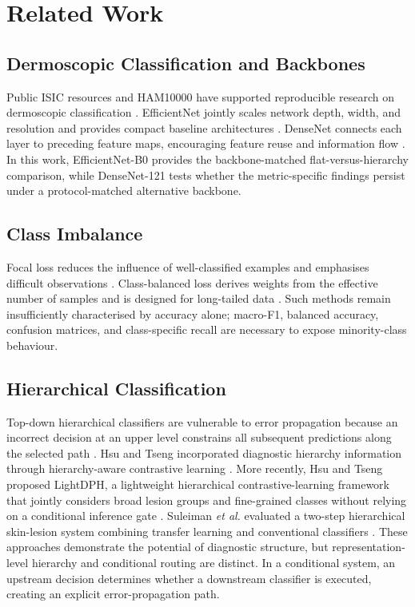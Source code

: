 \section{Related Work}
\label{sec:related_work}

\subsection{Dermoscopic Classification and Backbones}

Public ISIC resources and HAM10000 have supported reproducible research on
dermoscopic classification
\cite{codella2019isic2018,tschandl2018ham10000}. EfficientNet jointly scales
network depth, width, and resolution and provides compact baseline
architectures \cite{tan2019efficientnet}. DenseNet connects each layer to
preceding feature maps, encouraging feature reuse and information flow
\cite{huang2017}. In this work, EfficientNet-B0 provides the backbone-matched
flat-versus-hierarchy comparison, while DenseNet-121 tests whether the
metric-specific findings persist under a protocol-matched alternative
backbone.

\subsection{Class Imbalance}

Focal loss reduces the influence of well-classified examples and emphasises
difficult observations \cite{lin2017focal}. Class-balanced loss derives
weights from the effective number of samples and is designed for long-tailed
data \cite{cui2019classbalanced}. Such methods remain insufficiently
characterised by accuracy alone; macro-F1, balanced accuracy, confusion
matrices, and class-specific recall are necessary to expose minority-class
behaviour.

\subsection{Hierarchical Classification}

Top-down hierarchical classifiers are vulnerable to error propagation because
an incorrect decision at an upper level constrains all subsequent predictions
along the selected path \cite{silla2011survey}.
Hsu and Tseng incorporated diagnostic hierarchy information through
hierarchy-aware contrastive learning \cite{hsu2022hierarchy}. More recently, Hsu and Tseng proposed LightDPH, a lightweight
hierarchical contrastive-learning framework that jointly considers broad
lesion groups and fine-grained classes without relying on a conditional
inference gate \cite{hsu2024lightdph}. Suleiman
\emph{et al.} evaluated a two-step hierarchical skin-lesion system combining
transfer learning and conventional classifiers
\cite{suleiman2024twostep}. These approaches demonstrate the potential of
diagnostic structure, but representation-level hierarchy and conditional
routing are distinct. In a conditional system, an upstream decision determines
whether a downstream classifier is executed, creating an explicit
error-propagation path.

